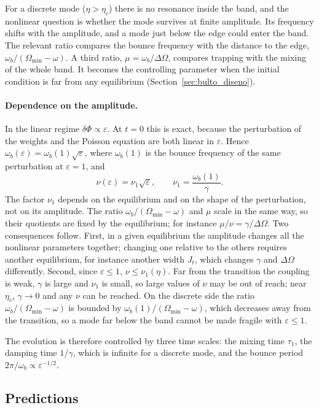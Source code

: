 \documentclass[11pt,a4paper]{article}
\begin{document}
For a discrete mode ($\eta>\eta_c$) there is no resonance inside the band, and the
nonlinear question is whether the mode survives at finite amplitude. Its frequency
shifts with the amplitude, and a mode just below the edge could enter the band. The
relevant ratio compares the bounce frequency with the distance to the edge,
$\omega_b/(\Omega_{\min}-\omega)$. A third ratio, $\mu=\omega_b/\Delta\Omega$, compares
trapping with the mixing of the whole band. It becomes the controlling parameter when
the initial condition is far from any equilibrium (Section~\ref{sec:bulto_diseno}).

\paragraph{Dependence on the amplitude.} In the linear regime $\delta\Phi\propto\varepsilon$. At
$t=0$ this is exact, because the perturbation of the weights and the Poisson equation
are both linear in $\varepsilon$. Hence $\omega_b(\varepsilon)=\omega_b(1)\sqrt\varepsilon$,
where $\omega_b(1)$ is the bounce frequency of the same perturbation at $\varepsilon=1$, and
\[
  \nu(\varepsilon)=\nu_1\sqrt\varepsilon,\qquad \nu_1=\frac{\omega_b(1)}{\gamma}.
\]
The factor $\nu_1$ depends on the equilibrium and on the shape of the perturbation, not
on its amplitude. The ratio $\omega_b/(\Omega_{\min}-\omega)$ and $\mu$ scale in the same way,
so their quotients are fixed by the equilibrium; for instance $\mu/\nu=\gamma/\Delta\Omega$.
Two consequences follow. First, in a given equilibrium the amplitude changes all the
nonlinear parameters together; changing one relative to the others requires another
equilibrium, for instance another width $J_t$, which changes $\gamma$ and $\Delta\Omega$
differently. Second, since $\varepsilon\le1$, $\nu\le\nu_1(\eta)$. Far from the transition
the coupling is weak, $\gamma$ is large and $\nu_1$ is small, so large values of $\nu$ may
be out of reach; near $\eta_c$, $\gamma\to0$ and any $\nu$ can be reached. On the discrete
side the ratio $\omega_b/(\Omega_{\min}-\omega)$ is bounded by $\omega_b(1)/(\Omega_{\min}-\omega)$,
which decreases away from the transition, so a mode far below the band cannot be made
fragile with $\varepsilon\le1$.

The evolution is therefore controlled by three time scales: the mixing time $\tau_1$,
the damping time $1/\gamma$, which is infinite for a discrete mode, and the bounce
period $2\pi/\omega_b\propto\varepsilon^{-1/2}$.

\subsection{Predictions}
\label{sec:predicciones}
\end{document}
